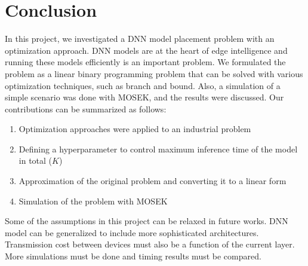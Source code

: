 \documentclass[lettersize,journal]{IEEEtran}
\begin{document}
\section{Conclusion}
In this project, we investigated a DNN model placement problem with an optimization approach. DNN models are at the heart of edge intelligence and running these models efficiently is an important problem. We formulated the problem as a linear binary programming problem that can be solved with various optimization techniques, such as branch and bound. Also, a simulation of a simple scenario was done with MOSEK, and the results were discussed. Our contributions can be summarized as follows:
\begin{enumerate}
\item{Optimization approaches were applied to an industrial problem}
\item{Defining a hyperparameter to control maximum inference time of the model in total ($K$)}
\item{Approximation of the original problem and converting it to a linear form}
\item{Simulation of the problem with MOSEK}
\end{enumerate}
Some of the assumptions in this project can be relaxed in future works. DNN model can be generalized to include more sophisticated architectures. Transmission cost between devices must also be a function of the current layer. More simulations must be done and timing results must be compared.



\end{document}
